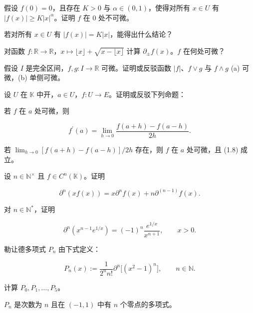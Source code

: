 \begin{exercises}
\begin{items}
\item

假设 $ f(0) = 0 $，且存在 $ K > 0 $ 与 $ \alpha \in (0,1) $，使得对所有 $ x \in U $ 有 $ |f(x)| \geq K|x|^\alpha $。证明 $ f $ 在 0 处不可微。

\item

若对所有 $ x \in U $ 有 $ |f(x)| = K|x| $，能得出什么结论？

\end{items}

\item

对函数 $ f: \mathbb{R} \to \mathbb{R} $，$ x \mapsto \lfloor x \rfloor + \sqrt{x - \lfloor x \rfloor} $ 计算 $ \partial_\pm f(x) $。$ f $ 在何处可微？

\item

假设 $ I $ 是完全区间，$ f, g: I \to \mathbb{R} $ 可微。证明或反驳函数 $ |f| $、$ f \vee g $ 与 $ f \wedge g $ (a) 可微，(b) 单侧可微。

\item

设 $U$ 在 $\mathbb{K}$ 中开，$a \in U$，$f: U \to E$。证明或反驳下列命题：

\begin{items}
\item

若 $f$ 在 $a$ 处可微，则

\[
f^{\prime}(a)=\lim_{h\to0}\frac{f(a+h)-f(a-h)}{2h}.
\]
\item

若 $ \lim_{h\to0}\left[f(a+h)-f(a-h)\right]/2h $ 存在，则 $f$ 在 $a$ 处可微，且 (1.8) 成立。

\end{items}

\item

设 $ n \in \mathbb{N}^\times $ 且 $ f \in C^n(\mathbb{K}) $。证明

\begin{equation}
\partial^{n}\left(x f(x)\right)=x\partial^{n}f(x)+n\partial^{(n-1)}f(x).
\end{equation}
\item

对 $ n \in \mathbb{N}^* $，证明

\[
\partial^{n}(x^{n-1}e^{1/x})=(-1)^{n}\frac{e^{1/x}}{x^{n+1}},\qquad x>0.
\]
\item

勒让德多项式 $ P_{n} $ 由下式定义：

\[
P_{n}(x):=\frac{1}{2^{n}n!}\partial^{n}\bigl[(x^{2}-1)^{n}\bigr],\qquad n\in\mathbb{N}.
\]

\begin{items}
\item

计算 $ P_{0}, P_{1}, \ldots, P_{5} $。

\item

\proofhead
$ P_{n} $ 是次数为 $n$ 且在 $ (-1,1) $ 中有 $n$ 个零点的多项式。
\end{items}

\end{exercises}

